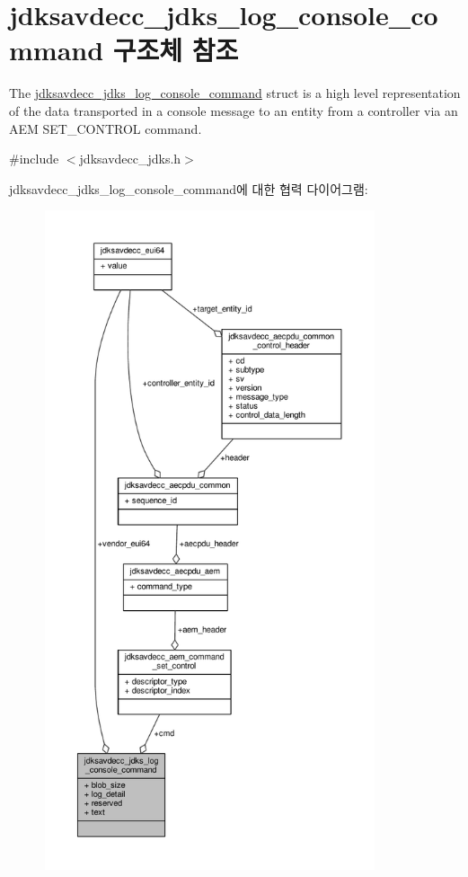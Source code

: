 \hypertarget{structjdksavdecc__jdks__log__console__command}{}\section{jdksavdecc\+\_\+jdks\+\_\+log\+\_\+console\+\_\+command 구조체 참조}
\label{structjdksavdecc__jdks__log__console__command}


The \hyperlink{structjdksavdecc__jdks__log__console__command}{jdksavdecc\+\_\+jdks\+\_\+log\+\_\+console\+\_\+command} struct is a high level representation of the data transported in a console message to an entity from a controller via an A\+EM S\+E\+T\+\_\+\+C\+O\+N\+T\+R\+OL command.  




{\ttfamily \#include $<$jdksavdecc\+\_\+jdks.\+h$>$}



jdksavdecc\+\_\+jdks\+\_\+log\+\_\+console\+\_\+command에 대한 협력 다이어그램\+:
\nopagebreak
\begin{figure}[H]
\begin{center}
\leavevmode
\includegraphics[height=550pt]{structjdksavdecc__jdks__log__console__command__coll__graph}
\end{center}
\end{figure}
